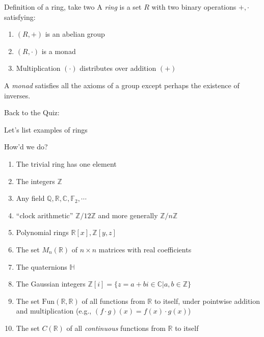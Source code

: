 \documentclass{beamer}
\newcommand{\Z}{\mathbb{Z}}
\begin{document}
\begin{frame}{Definition of a ring, take two}
A \emph{ring} is a set $R$ with two binary operations $+,\cdot$ satisfying:

\begin{enumerate}
\item $(R,+)$ is an abelian group
\item $(R,\cdot)$ is a monad
\item Multiplication $(\cdot)$ distributes over addition $(+)$
\end{enumerate}

A \emph{monad} satisfies all the axioms of a group except perhaps the existence of inverses.
\end{frame}

\begin{frame}[plain,c]

\begin{center}

\Huge

 Back to the Quiz:
 
Let's list examples of rings
\end{center}

\end{frame}


\begin{frame}{How'd we do?}
\begin{enumerate}
\item The trivial ring has one element
\item The integers $\mathbb{Z}$
\item Any field $\mathbb{Q}, \mathbb{R}, \mathbb{C}, \mathbb{F}_2, \cdots$
\item ``clock arithmetic'' $\mathbb{Z}/12\mathbb{Z}$ and more generally $\mathbb{Z}/n\mathbb{Z}$
\item Polynomial rings $\mathbb{R}[x], \mathbb{\Z}[y,z]$
\item The set $M_n(\mathbb{R})$ of $n\times n$ matrices with real coefficients
\item The quaternions $\mathbb{H}$
\item The Gaussian integers $\mathbb{Z}[i]=\{z=a+bi\in \mathbb{C} | a,b\in \mathbb{Z}\}$
\item The set $\text{Fun}(\mathbb{R}, \mathbb{R})$ of all functions from $\mathbb{R}$ to itself, under pointwise addition and multiplication (e.g., $(f\cdot g)(x)=f(x)\cdot g(x)$)
\item The set $C(\mathbb{R})$ of all \emph{continuous} functions from $\mathbb{R}$ to itself
\end{enumerate}
\end{frame}
\end{document}
